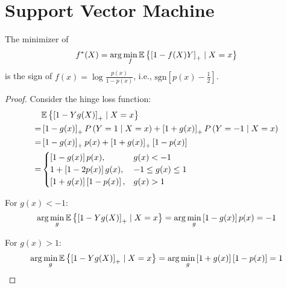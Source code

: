 \chapter{Support Vector Machine}

\begin{theorem}
	The minimizer of
	\begin{equation*}
		f^{*}(X)=\arg\min_{f}\mathbb{E}\left\{\left[1-f(X)Y\right]_{+}\mid X=x\right\}
	\end{equation*}
	is the sign of \(f(x)=\log\frac{p(x)}{1-p(x)}\), i.e., \(\text{sgn}\left[p(x)-\frac{1}{2}\right]\).
\end{theorem}

\begin{proof}
	Consider the hinge loss function:
	\begin{equation*}
		\begin{aligned}
			  & \mathbb{E}\left\{\left[1 - Yg(X)\right]_{+} \mid X = x\right\}                                                             \\
			= & \left[1 - g(x)\right]_{+} P\left(Y = 1 \mid X = x\right) + \left[1 + g(x)\right]_{+} P\left(Y = -1 \mid X = x\right) \\
			= & \left[1 - g(x)\right]_{+} p(x) + \left[1 + g(x)\right]_{+} \left[1 - p(x)\right]                                     \\
			= & \begin{cases}
				    \left[1 - g(x)\right] p(x),                  & g(x) < -1           \\
				    1 + \left[1 - 2p(x)\right] g(x),             & -1 \leq g(x) \leq 1 \\
				    \left[1 + g(x)\right] \left[1 - p(x)\right], & g(x) > 1
			    \end{cases}
		\end{aligned}
	\end{equation*}

	For \(g(x) < -1\):
	\begin{equation*}
		\arg\min_{g} \mathbb{E}\left\{\left[1 - Yg(X)\right]_{+} \mid X = x\right\} = \arg\min_{g} \left[1 - g(x)\right] p(x) = -1
	\end{equation*}

	For \(g(x) > 1\):
	\begin{equation*}
		\arg\min_{g} \mathbb{E}\left\{\left[1 - Yg(X)\right]_{+} \mid X = x\right\} = \arg\min_{g} \left[1 + g(x)\right] \left[1 - p(x)\right] = 1
	\end{equation*}


\end{proof}

